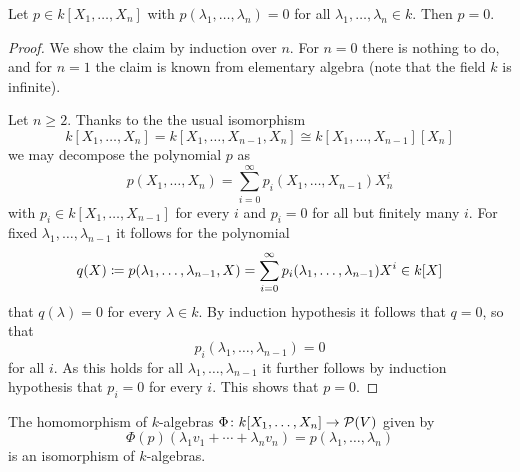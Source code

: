 \begin{lemma}
  \label{lemma: polynomial vanishes everywhere}
  Let $p \in k[X_1, \dotsc, X_n]$ with $p(\lambda_1, \dotsc, \lambda_n) = 0$ for all $\lambda_1, \dotsc, \lambda_n \in k$.
  Then $p = 0$.
\end{lemma}


\begin{proof}
  We show the claim by induction over $n$.
  For $n = 0$ there is nothing to do, and for $n = 1$ the claim is known from elementary algebra (note that the field $k$ is infinite).
  
  Let $n \geq 2$.
  Thanks to the the usual isomorphism
  \[
          k[X_1, \dotsc, X_n]
    =     k[X_1, \dotsc, X_{n-1}, X_n]
    \cong k[X_1, \dotsc, X_{n-1}][X_n]
  \]
  we may decompose the polynomial $p$ as
  \[
      p(X_1, \dotsc, X_n)
    = \sum_{i=0}^\infty p_i(X_1, \dotsc, X_{n-1}) X_n^i
  \]
  with $p_i \in k[X_1, \dotsc, X_{n-1}]$ for every $i$ and $p_i = 0$ for all but finitely many $i$.
  For fixed $\lambda_1, \dotsc, \lambda_{n-1}$ it follows for the polynomial
  \[
              q(X)
    \coloneqq  p(\lambda_1, \dotsc, \lambda_{n-1}, X)
    =         \sum_{i=0}^\infty p_i(\lambda_1, \dotsc, \lambda_{n-1}) X^i
    \in       k[X]
  \]
  that $q(\lambda) = 0$ for every $\lambda \in k$.
  By induction hypothesis it follows that $q = 0$, so that
  \[
      p_i(\lambda_1, \dotsc, \lambda_{n-1})
    = 0
  \]
  for all $i$.
  As this holds for all $\lambda_1, \dotsc, \lambda_{n-1}$ it further follows by induction hypothesis that $p_i = 0$ for every $i$.
  This shows that $p = 0$.
\end{proof}


\begin{corollary}
  \label{corollary: isomorphism poylnomial ring and polynomial maps}
  The homomorphism of $k$-algebras $\Phi \colon k[X_1, \dotsc, X_n] \to \mathcal{P}(V)$ given by
  \[
      \Phi(p)(\lambda_1 v_1 + \dotsb + \lambda_n v_n)
    = p(\lambda_1, \dotsc, \lambda_n)
  \]
  is an isomorphism of $k$-algebras.
\end{corollary}


